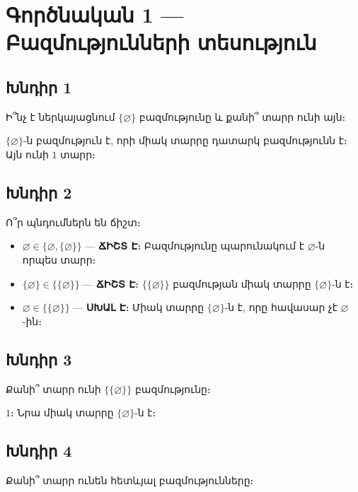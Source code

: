
\section*{Գործնական 1 — Բազմությունների տեսություն}

\subsection*{Խնդիր 1}
Ի՞նչ է ներկայացնում $\{\varnothing\}$ բազմությունը և քանի՞ տարր ունի այն։

$\{\varnothing\}$-ն բազմություն է, որի միակ տարրը դատարկ բազմությունն է։ Այն ունի $\boxed{1}$ տարր։

\subsection*{Խնդիր 2}
Ո՞ր պնդումներն են ճիշտ։

\begin{itemize}
  \item[2.1.] $\varnothing \in \{\varnothing, \{\varnothing\}\}$ — \textbf{ՃԻՇՏ Է}։ Բազմությունը պարունակում է $\varnothing$-ն որպես տարր։
  \item[2.2.] $\{\varnothing\} \in \{\{\varnothing\}\}$ — \textbf{ՃԻՇՏ Է}։ $\{\{\varnothing\}\}$ բազմության միակ տարրը $\{\varnothing\}$-ն է։
  \item[2.3.] $\varnothing \in \{\{\varnothing\}\}$ — \textbf{ՍԽԱԼ Է}։ Միակ տարրը $\{\varnothing\}$-ն է, որը հավասար չէ $\varnothing$-ին։
\end{itemize}

\subsection*{Խնդիր 3}
Քանի՞ տարր ունի $\{\{\varnothing\}\}$ բազմությունը։

$\boxed{1}$։ Նրա միակ տարրը $\{\varnothing\}$-ն է։

\subsection*{Խնդիր 4}
Քանի՞ տարր ունեն հետևյալ բազմությունները։


